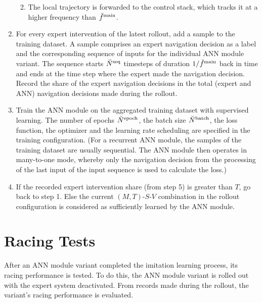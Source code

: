 \begin{enumerate}
\begin{enumerate}
\begin{enumerate}
        \end{enumerate}
        \item The local trajectory is forwarded to the control stack,
        which tracks it at a higher frequency than $\freq[\user]{\main}{}{}{}$.
    \end{enumerate}
    \item For every expert intervention of the latest rollout, 
    add a sample to the training dataset.
    A sample comprises an expert navigation decision as a label
    and the corresponding sequence of inputs
    for the individual ANN module variant.
    The sequence starts $\seqLen$ timesteps 
    of duration $1/\freq[\user]{\main}{}{}{}$ 
    back in time and
    ends at the time step where
    the expert made the navigation decision.
    Record the share of the expert navigation decisions 
    in the total (expert and ANN) navigation decisions made during the rollout.
    \item Train the ANN module on the 
    aggregated training dataset with supervised learning.
    The number of epochs $\num[\user]{\text{epoch}}{}{}{}$,
    the batch size $\batchSize$,
    the loss function, the optimizer and the learning rate scheduling
    are specified in the training configuration.
    (For a recurrent ANN module, the samples of the training dataset
    are usually sequential. The ANN module then operates in many-to-one mode,
    whereby only the navigation decision from the processing of the last input 
    of the input sequence is used to calculate the loss.)
    \item If the recorded expert intervention share (from step 5) is greater
    than $T$, go back to step 1. Else the current 
    $(M,T)$-$S$-$V$ combination in the rollout configuration
    is considered as sufficiently learned by the ANN module.
\end{enumerate}

\section{Racing Tests}
After an ANN module variant completed the imitation learning process,
its racing performance is tested.
To do this, the ANN module variant is rolled out
with the expert system deactivated.
From records made during the rollout,
the variant's racing performance is evaluated.



